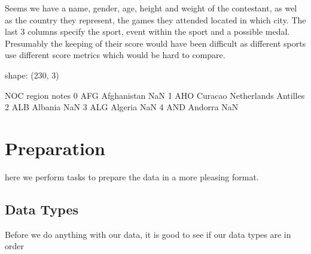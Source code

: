 \documentclass[letterpaper,10pt,english]{jupyterBook}
\begin{document}
\sphinxAtStartPar
Seems we have a name, gender, age, height and weight of the contestant, as wel as the country they represent, the games they attended located in which city. The last 3 columns specify the sport, event within the sport and a possible medal. Presumably the keeping of their score would have been difficult as different sports use different score metrics which would be hard to compare.

\begin{sphinxVerbatim}[commandchars=\\\{\}]
  
  
\end{sphinxVerbatim}

\begin{sphinxVerbatim}[commandchars=\\\{\}]
shape: (230, 3)
\end{sphinxVerbatim}

\begin{sphinxVerbatim}[commandchars=\\\{\}]
   NOC       region                 notes
0  AFG  Afghanistan                   NaN
1  AHO      Curacao  Netherlands Antilles
2  ALB      Albania                   NaN
3  ALG      Algeria                   NaN
4  AND      Andorra                   NaN
\end{sphinxVerbatim}


\section{Preparation}
\label{\detokenize{c7_case_studies/Olympics:preparation}}
\sphinxAtStartPar
here we perform tasks to prepare the data in a more pleasing format.


\subsection{Data Types}
\label{\detokenize{c7_case_studies/Olympics:data-types}}
\sphinxAtStartPar
Before we do anything with our data, it is good to see if our data types are in order
\end{document}

